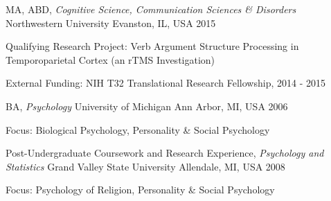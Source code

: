 
\vspace{1.0mm}
\begin{cventries}

  \cventry
    {MA, ABD, \textit{Cognitive Science, Communication Sciences \& Disorders}} %
    {Northwestern University} %
    {Evanston, IL, USA} %
    {2015} %
    {
      \begin{cvitems} %
        \item {Qualifying Research Project: Verb Argument Structure Processing in Temporoparietal Cortex (an rTMS Investigation)}
        \item {External Funding: NIH T32 Translational Research Fellowship, 2014 - 2015}
      \end{cvitems}
    }

  \cventry
    {BA, \textit{Psychology}} %
    {University of Michigan} %
    {Ann Arbor, MI, USA} %
    {2006} %
    {
    \begin{cvitems}
    \item {Focus: Biological Psychology, Personality \& Social Psychology}
    \end{cvitems}
    }
 \cventry
    {Post-Undergraduate Coursework and Research Experience, \textit{Psychology and Statistics}} %
    {Grand Valley State University} %
    {Allendale, MI, USA} %
    {2008} %
    {
    \begin{cvitems}
    \item {Focus: Psychology of Religion, Personality \& Social Psychology}
    \end{cvitems}
    }

\end{cventries}

